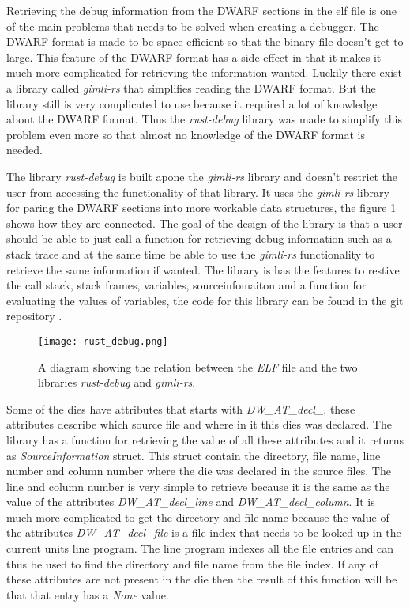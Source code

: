 
Retrieving the debug information from the \gls{DWARF} sections in the \gls{elf} file is one of the main problems that needs to be solved when creating a debugger.
The \gls{DWARF} format is made to be space efficient so that the binary file doesn't get to large.
This feature of the \gls{DWARF} format has a side effect in that it makes it much more complicated for retrieving the information wanted.
Luckily there exist a library called \emph{gimli-rs}\cite{gimli} that simplifies reading the \gls{DWARF} format.
But the library still is very complicated to use because it required a lot of knowledge about the \gls{DWARF} format.
Thus the \emph{rust-debug} library was made to simplify this problem even more so that almost no knowledge of the \gls{DWARF} format is needed.


The library \emph{rust-debug} is built apone the \emph{gimli-rs} library and doesn't restrict the user from accessing the functionality of that library.
It uses the \emph{gimli-rs} library for paring the \gls{DWARF} sections into more workable data structures, the figure \ref{fig:rustdebug} shows how they are connected.
The goal of the design of the library is that a user should be able to just call a function for retrieving debug information such as a stack trace and at the same time be able to use the \emph{gimli-rs} functionality to retrieve the same information if wanted.
The library is has the features to restive the call stack, stack frames, variables, sourceinfomaiton and a function for evaluating the values of variables, the code for this library can be found in the git repository \cite{rust-debug}.


\begin{figure}[h]
	\centering
	\texttt{[image: rust\_debug.png]}
	\caption{A diagram showing the relation between the \emph{ELF} file and the two libraries \emph{rust-debug} and \emph{gimli-rs}.}
	\label{fig:rustdebug}
\end{figure}


Some of the dies have attributes that starts with \emph{DW\_AT\_decl\_}, these attributes describe which source file and where in it this dies was declared.
The library has a function for retrieving the value of all these attributes and it returns as \emph{SourceInformation} struct.
This struct contain the directory, file name, line number and column number where the die was declared in the source files.
The line and column number is very simple to retrieve because it is the same as the value of the attributes \emph{DW\_AT\_decl\_line} and \emph{DW\_AT\_decl\_column}.
It is much more complicated to get the directory and file name because the value of the attributes \emph{DW\_AT\_decl\_file} is a file index that needs to be looked up in the current units line program.
The line program indexes all the file entries and can thus be used to find the directory and file name from the file index.
If any of these attributes are not present in the die then the result of this function will be that that entry has a \emph{None} value.


